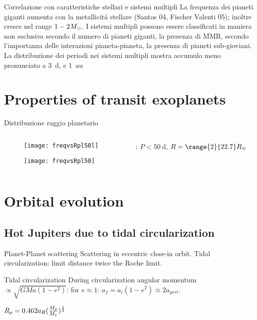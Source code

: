\begin{wordonframe}{Correlazione con caratteristiche stellari e sistemi multipli}
La frequenza dei pianeti giganti aumenta con la metallicit\'a stellare (Santos 04, Fischer Valenti 05); inoltre cresce nel range $1-2M_{\odot}{}$.
I sistemi multipli possono essere classificati in maniera non esclusiva secondo il numero di pianeti giganti, la presenza di MMR, secondo l'importanza delle interazioni pianeta-pianeta, la presenza di pianeti sub-gioviani.
La distribuzione dei periodi nei sistemi multipli mostra accumulo meno pronunciato a \SI{3}{\day}, e \SI{1}{\astronomicalunit}
\end{wordonframe}


\section{Properties of transit exoplanets}

\begin{frame}{Distribuzione raggio planetario}
\begin{columns}  \begin{column}{0.5\textwidth}
\begin{figure} \centering \texttt{[image: freqvsRpl50l]} \label{fig:freqvsRpl50l}
\end{figure}

\begin{figure}
\centering \texttt{[image: freqvsRpl50]}\label{fig:freqvsRpl50}\end{figure} 
\end{column} \begin{column}{0.5\textwidth}
\cite{howard2012planet}: $P<\SI{50}{\day}$, $R=\range{2}{22.7}\rearth{}$
\begin{equation*}

\end{equation*}
\end{column}  \end{columns}
\end{frame}

\section{Orbital evolution}

\subsection{Hot Jupiters due to tidal circularization}

\begin{frame}{Planet-Planet scattering}
Scattering in eccentric close-in orbit. Tidal circularization: limit distance twice the Roche limit.
\end{frame}

\begin{wordonframe}{Tidal circularization}
During circularization angular momentum $\propto \sqrt{GMa(1-e^2)}$: for $e\approx1$: $a_f=a_i(1-e^2)\approx2a_{peri}$.

$R_p=0.462a_R(\frac{M_p}{M_*})^{\frac{1}{3}}$ 
\end{wordonframe}
